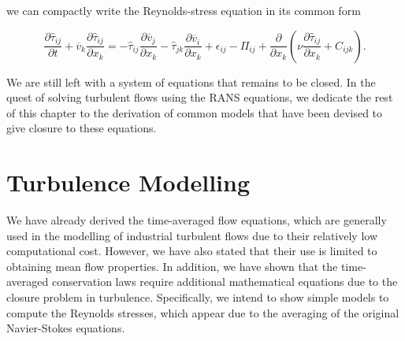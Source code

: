 we can compactly write the Reynolds-stress equation in its common form
\begin{eqBox}
	\begin{equation}
		\frac{\partial \hat \tau_{ij}}{\partial t} + \overline v_k \frac{\partial \hat \tau_{ij}}{\partial x_k}
		= - \hat\tau_{ij}\frac{\partial \overline v_j}{\partial x_k} 
		- \hat\tau_{jk}\frac{\partial \overline v_i }{\partial x_k} 
		+ \epsilon_{ij} - \Pi_{ij}
		+ \frac{\partial}{\partial x_k} \left(\nu \frac{\partial \hat\tau_{ij}}{\partial x_k} + C_{ijk}\right).
	\end{equation}
\end{eqBox}
We are still left with a system of equations that remains to be closed. In the quest of solving turbulent flows using the RANS equations, we dedicate the rest of this chapter to the derivation of common models that have been devised to give closure to these equations.
\section{Turbulence Modelling}
We have already derived the time-averaged flow equations, which are generally used in the modelling of industrial turbulent flows due to their relatively low computational cost. However, we have also stated that their use is limited to obtaining mean flow properties. In addition, we have shown that the time-averaged conservation laws require additional mathematical equations due to the closure problem in turbulence. Specifically, we intend to show simple models to compute the Reynolds stresses, which appear due to the averaging of the original Navier-Stokes equations. 
